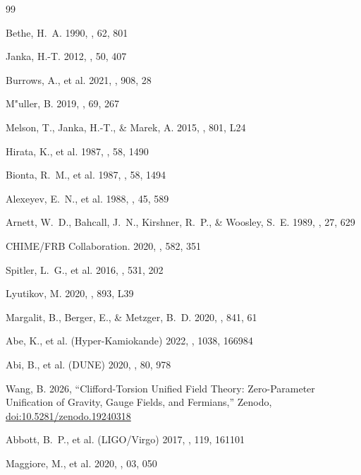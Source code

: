 \documentclass[twocolumn, tightenlines, showpacs, showkeys, nofootinbib]{revtex4-1}
\begin{document}

\begin{thebibliography}{99}

Bethe, H.~A. 1990, \revmp, 62, 801

Janka, H.-T. 2012, \araa, 50, 407

Burrows, A., et al. 2021, \apj, 908, 28

M"uller, B. 2019, \arnps, 69, 267

Melson, T., Janka, H.-T., \& Marek, A. 2015, \apjl, 801, L24

Hirata, K., et al. 1987, \prl, 58, 1490

Bionta, R.~M., et al. 1987, \prl, 58, 1494

Alexeyev, E.~N., et al. 1988, \itc, 45, 589

Arnett, W.~D., Bahcall, J.~N., Kirshner, R.~P., \& Woosley, S.~E. 1989, \araa, 27, 629

CHIME/FRB Collaboration. 2020, \nat, 582, 351

Spitler, L.~G., et al. 2016, \nat, 531, 202

Lyutikov, M. 2020, \apjl, 893, L39

Margalit, B., Berger, E., \& Metzger, B.~D. 2020, \apj, 841, 61

Abe, K., et al. (Hyper-Kamiokande) 2022, \nima, 1038, 166984

Abi, B., et al. (DUNE) 2020, \epjc, 80, 978

Wang, B. 2026, ``Clifford-Torsion Unified Field Theory: 
Zero-Parameter Unification of Gravity, Gauge Fields, and Fermians,'' 
Zenodo, \href{https://doi.org/10.5281/zenodo.19240318}{doi:10.5281/zenodo.19240318}

Abbott, B.~P., et al. (LIGO/Virgo) 2017, \prl, 119, 161101

Maggiore, M., et al. 2020, \jcap, 03, 050

\end{thebibliography}
\end{document}

